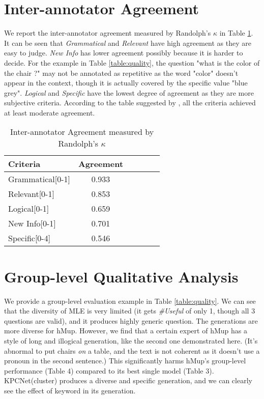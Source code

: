 \documentclass[letterpaper]{article} %
\begin{document}
\linenumbers

\section{Inter-annotator Agreement}

We report the inter-annotator agreement measured by Randolph’s $\kappa$ \citep{randolph2005free} in Table \ref{tab:inter-annotator}. It can be seen that \textit{Grammatical} and \textit{Relevant} have high agreement as they are easy to judge. \textit{New Info} has lower agreement possibly because it is harder to decide. For the example in Table \ref{table:quality}, the question "what is the color of the chair ?" may not be annotated as repetitive as the word "color" doesn't appear in the context, though it is actually covered by the specific value "blue grey". \textit{Logical} and \textit{Specific} have the lowest degree of agreement as they are more subjective criteria. According to the table suggested by \citet{landis1977measurement}, all the criteria achieved at least moderate agreement.


\begin{table}[htbp]
  \centering
  \begin{tabular}{l|ccccc}
  \hline
  Criteria & Agreement \\
  \hline
  Grammatical\tiny{[0-1]}  &  0.933 \\
  Relevant\tiny{[0-1]} &  0.853 \\
  Logical\tiny{[0-1]} &  0.659  \\
  New Info\tiny{[0-1]} &  0.701  \\
  Specific\tiny{[0-4]} &  0.546  \\
  \hline
  \end{tabular}
  \caption{\label{tab:inter-annotator} Inter-annotator Agreement measured by Randolph’s $\kappa$ \citep{randolph2005free}}
\end{table}


\section{Group-level Qualitative Analysis}
\label{sec:quality}

We provide a group-level evaluation example in Table \ref{table:quality}. We can see that the diversity of MLE is very limited (it gets \textit{\#Useful} of only 1, though all 3 questions are valid), and it produces highly generic question. The generations are more diverse for hMup. However, we find that a certain expert of hMup has a style of long and illogical generation, like the second one demonstrated here. (It's abnormal to put chairs \textit{on} a table, and the text is not coherent as it doesn't use a pronoun in the second sentence.) This significantly harms hMup's group-level performance (Table 4) compared to its best single model (Table 3). KPCNet(cluster) produces a diverse and specific generation, and we can clearly see the effect of keyword in its generation. 
\end{document}
